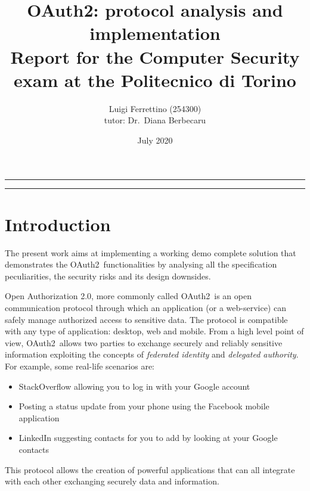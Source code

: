 \documentclass[a4paper,12pt]{article}
\def\oauth{OAuth2\xspace}
\begin{document}
\title{\oauth: protocol analysis and implementation
\\
{\normalsize Report for the Computer Security exam at the Politecnico di Torino}
}
\author{Luigi Ferrettino (254300)
\\
{\normalsize tutor: Dr.~Diana Berbecaru}
}
\date{July 2020}
\maketitle

\vfill

\rule{\textwidth}{1pt}
\newpage
\tableofcontents

\rule{\textwidth}{1pt}

\vfill

\newpage


\section{Introduction}
The present work aims at implementing a working demo complete solution that demonstrates the \oauth\ functionalities by analysing all the specification peculiarities, the security risks and its design downsides.

Open Authorization 2.0, more commonly called \oauth\, is an open communication protocol through which an application (or a web-service) can safely manage authorized access to sensitive data. The protocol is compatible with any type of application: desktop, web and mobile.
From a high level point of view, \oauth\ allows two parties to exchange securely and reliably sensitive information exploiting the concepts of \textit{federated identity} and \textit{delegated authority}. For example, some real-life scenarios are:

\begin{itemize}
    \item StackOverflow allowing you to log in with your Google account
    \item Posting a status update from your phone using the Facebook mobile application
    \item LinkedIn suggesting contacts for you to add by looking at your Google contacts
\end{itemize}

This protocol allows the creation of powerful applications that can all integrate with each other exchanging securely data and information.
\end{document}
